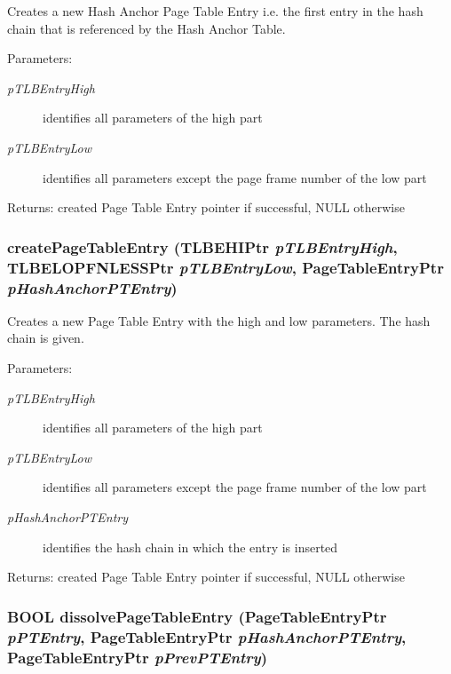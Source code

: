 Creates a new Hash Anchor Page Table Entry i.e. the first entry in the hash chain that is referenced by the Hash Anchor Table. \begin{Desc}
\item[Parameters:]
\begin{description}
\item[{\em pTLBEntryHigh}]identifies all parameters of the high part \item[{\em pTLBEntryLow}]identifies all parameters except the page frame number of the low part \end{description}
\end{Desc}
\begin{Desc}
\item[Returns:]created Page Table Entry pointer if successful, NULL otherwise \end{Desc}
\hypertarget{group___v_m_m___p_t_g5002efe2fb3da2510b62affe18807174}{
\subsubsection[{createPageTableEntry}]{ createPageTableEntry ({\bf TLBEHIPtr} {\em pTLBEntryHigh}, \/  {\bf TLBELOPFNLESSPtr} {\em pTLBEntryLow}, \/  {\bf PageTableEntryPtr} {\em pHashAnchorPTEntry})}}
\label{group___v_m_m___p_t_g5002efe2fb3da2510b62affe18807174}


Creates a new Page Table Entry with the high and low parameters. The hash chain is given. \begin{Desc}
\item[Parameters:]
\begin{description}
\item[{\em pTLBEntryHigh}]identifies all parameters of the high part \item[{\em pTLBEntryLow}]identifies all parameters except the page frame number of the low part \item[{\em pHashAnchorPTEntry}]identifies the hash chain in which the entry is inserted \end{description}
\end{Desc}
\begin{Desc}
\item[Returns:]created Page Table Entry pointer if successful, NULL otherwise \end{Desc}
\hypertarget{group___v_m_m___p_t_g0037f23be8f09ed71ce7ff34f93adcb9}{
\subsubsection[{dissolvePageTableEntry}]{\setlength{\rightskip}{0pt plus 5cm}BOOL dissolvePageTableEntry ({\bf PageTableEntryPtr} {\em pPTEntry}, \/  {\bf PageTableEntryPtr} {\em pHashAnchorPTEntry}, \/  {\bf PageTableEntryPtr} {\em pPrevPTEntry})}}
\label{group___v_m_m___p_t_g0037f23be8f09ed71ce7ff34f93adcb9}


